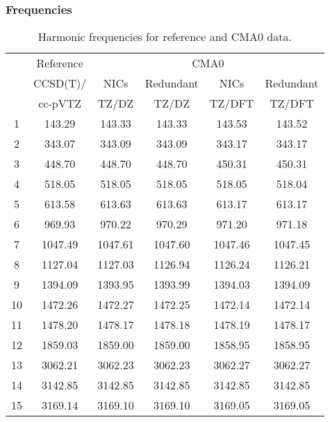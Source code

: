 \documentclass[10pt,oneside]{article}
\begin{document}
\begin{table}[h!]
\subsubsection*{Frequencies}
\centering
\caption{Harmonic frequencies for reference and CMA0 data.}
\begin{tabular}{cccccc}
\toprule
{} & Reference & \multicolumn{4}{c}{CMA0} \\
{} &  CCSD(T)/ &    NICs &  Redundant &    NICs & Redundant \\
{} &   cc-pVTZ &   TZ/DZ &      TZ/DZ &  TZ/DFT &    TZ/DFT \\
\midrule
1  &    143.29 &  143.33 &     143.33 &  143.53 &    143.52 \\
2  &    343.07 &  343.09 &     343.09 &  343.17 &    343.17 \\
3  &    448.70 &  448.70 &     448.70 &  450.31 &    450.31 \\
4  &    518.05 &  518.05 &     518.05 &  518.05 &    518.04 \\
5  &    613.58 &  613.63 &     613.63 &  613.17 &    613.17 \\
6  &    969.93 &  970.22 &     970.29 &  971.20 &    971.18 \\
7  &   1047.49 & 1047.61 &    1047.60 & 1047.46 &   1047.45 \\
8  &   1127.04 & 1127.03 &    1126.94 & 1126.24 &   1126.21 \\
9  &   1394.09 & 1393.95 &    1393.99 & 1394.03 &   1394.09 \\
10 &   1472.26 & 1472.27 &    1472.25 & 1472.14 &   1472.14 \\
11 &   1478.20 & 1478.17 &    1478.18 & 1478.19 &   1478.17 \\
12 &   1859.03 & 1859.00 &    1859.00 & 1858.95 &   1858.95 \\
13 &   3062.21 & 3062.23 &    3062.23 & 3062.27 &   3062.27 \\
14 &   3142.85 & 3142.85 &    3142.85 & 3142.85 &   3142.85 \\
15 &   3169.14 & 3169.10 &    3169.10 & 3169.05 &   3169.05 \\
\bottomrule
\end{tabular}
\end{table}
\end{document}
